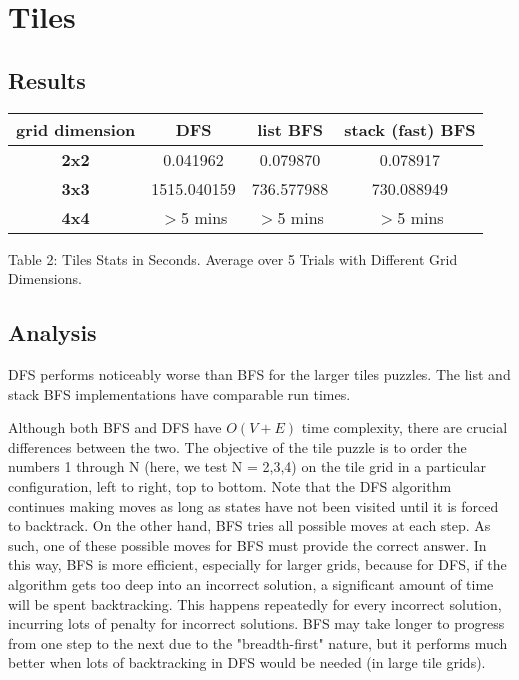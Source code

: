 \documentclass[12pt]{article}
\begin{document}
\section{Tiles}

\subsection{Results}

\begin{center}
\begin{tabular}{ |c|c|c|c| } 
\hline
\textbf{grid dimension} & \textbf{DFS} & \textbf{list BFS} & \textbf{stack (fast) BFS} \\
\hline
\textbf{2x2} & 0.041962 & 0.079870 & 0.078917 \\ 
\textbf{3x3} & 1515.040159 & 736.577988 & 730.088949 \\
\textbf{4x4} & $>$5 mins & $>$5 mins & $>$5 mins \\
\hline
\end{tabular}
\end{center}
Table 2: Tiles Stats in Seconds. Average over 5 Trials with Different Grid Dimensions.


\subsection{Analysis}
\noindent

DFS performs noticeably worse than BFS for the larger tiles puzzles. The list and stack BFS implementations have comparable run times. 

Although both BFS and DFS have $O(V+E)$ time complexity, there are crucial differences between the two. The objective of the tile puzzle is to order the numbers 1 through N (here, we test N = 2,3,4) on the tile grid in a particular configuration, left to right, top to bottom. Note that the DFS algorithm continues making moves as long as states have not been visited until it is forced to backtrack. On the other hand, BFS tries all possible moves at each step. As such, one of these possible moves for BFS must provide the correct answer. In this way, BFS is more efficient, especially for larger grids, because for DFS, if the algorithm gets too deep into an incorrect solution, a significant amount of time will be spent backtracking. This happens repeatedly for every incorrect solution, incurring lots of penalty for incorrect solutions. BFS may take longer to progress from one step to the next due to the "breadth-first" nature, but it performs much better when lots of backtracking in DFS would be needed (in large tile grids).
\end{document}

